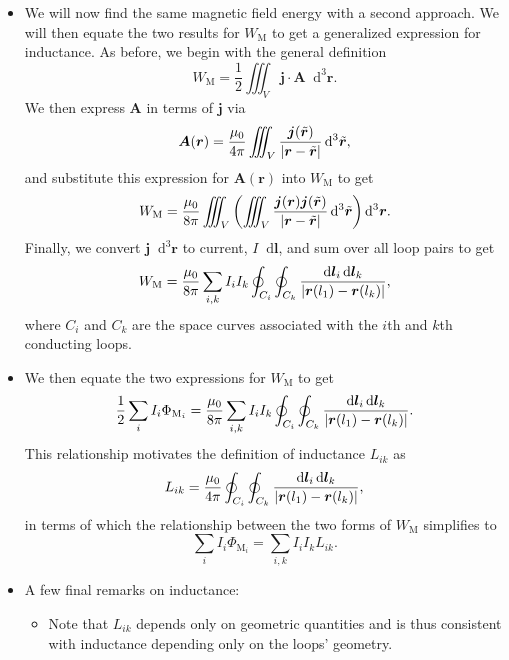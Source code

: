 \documentclass[11pt, a4paper]{article}
\newcommand{\diff}{\mathop{}\!\mathrm{d}} %
\newcommand{\dr}{\diff^{3} \r}  %
\newcommand{\dtr}{\diff^{3} \tilde{\r}}  %
\renewcommand{\vec}[1]{\bm{#1}} %
\renewcommand{\t}[1]{\tilde{#1}} %
\renewcommand{\r}{\vec{r}}
\newcommand{\A}{\vec{A}} %
\newcommand{\mm}{\mu_{0}}  %
\renewcommand{\j}{\vec{j}}  %
\begin{document}
\begin{itemize}
	\item We will now find the same magnetic field energy with a second approach. We will then equate the two results for $ W_{\text{M}} $ to get a generalized expression for inductance. As before, we begin with the general definition
	\begin{equation*}
		W_{\text{M}} = \frac{1}{2}\iiint_{V} \j \cdot \A \dr.
	\end{equation*}
	We then express $ \A $ in terms of $ \j $ via
	\begin{equation*}
		\A(\r) = \frac{\mm}{4\pi}\iiint_{V}\frac{\j(\t{\r})}{\abs{\r - \t{\r}}}\dtr,
	\end{equation*}
    and substitute this expression for $ \A(\r) $ into $ W_{\text{M}} $ to get
	\begin{equation*}
		W_{\text{M}} = \frac{\mm}{8\pi}\iiint_{V} \left(\iiint_{V}\frac{\j(\r)\j(\t{\r})}{\abs{\r - \t{\r}}}\dtr\right)\dr.
	\end{equation*}
	Finally, we convert $ \j \dr $ to current, $ I \diff \vec{l} $, and sum over all loop pairs to get
	\begin{equation*}
		W_{\text{M}} = \frac{\mm}{8\pi}\sum_{i, k}I_{i}I_{k}\oint_{C_{i}}\oint_{C_{k}}\frac{\diff \vec{l}_{i}\diff \vec{l}_{k}}{\abs{\r(l_{1}) - \r(l_{k})}},
	\end{equation*}
	where $ C_{i} $ and $ C_{k} $ are the space curves associated with the $ i $th and $ k $th conducting loops.
	
	\item We then equate the two expressions for $ W_{\text{M}} $ to get
	\begin{equation*}
		\frac{1}{2}\sum_{i}I_{i}\Phi_{\text{M}_{i}} = \frac{\mm}{8\pi}\sum_{i, k}I_{i}I_{k}\oint_{C_{i}}\oint_{C_{k}}\frac{\diff \vec{l}_{i}\diff \vec{l}_{k}}{\abs{\r(l_{1}) - \r(l_{k})}}.
	\end{equation*}
    This relationship motivates the definition of inductance $ L_{ik} $ as
	\begin{equation*}
		L_{ik} = \frac{\mm}{4\pi}\oint_{C_{i}}\oint_{C_{k}}\frac{\diff \vec{l}_{i}\diff \vec{l}_{k}}{\abs{\r(l_{1}) - \r(l_{k})}},
	\end{equation*}
    in terms of which the relationship between the two forms of $ W_{\text{M}} $ simplifies to
	\begin{equation*}
		\sum_{i}I_{i}\Phi_{\text{M}_{i}} = \sum_{i, k}I_{i}I_{k} L_{ik}.
	\end{equation*}
	
	\item A few final remarks on inductance:
    \begin{itemize}
        \item Note that $ L_{ik} $ depends only on geometric quantities and is thus consistent with inductance depending only on the loops' geometry.


\end{itemize}
\end{itemize}
\end{document}
